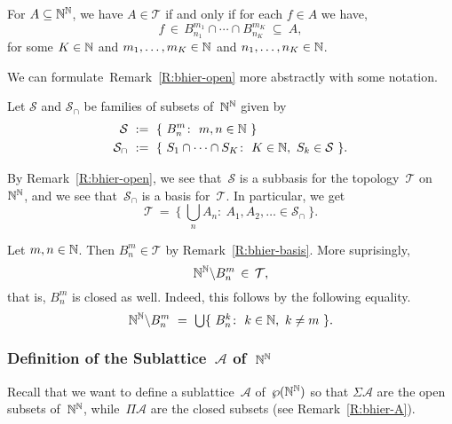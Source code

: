 \begin{rem}
\label{R:bhier-open}
For $A\subseteq \mathbb{N}^{\mathbb{N}}$,
we have $A\in \mathcal{T}$
if and only if for each $f\in A$
we have,
\begin{equation*}
f\,\in\, B^{m_1}_{n_1} \cap \dotsb \cap B^{m_K}_{n_K} \ \subseteq\ A,
\end{equation*}
for some $K\in\mathbb{N}$ and $m_1,\dotsc,m_K\in\mathbb{N}$
and $n_1,\dotsc,n_K\in\mathbb{N}$.
\end{rem}

We can formulate~Remark~\ref{R:bhier-open} more abstractly
with some notation.
\begin{dfn}
Let $\mathcal{S}$ and $\mathcal{S}_\cap$
be families of subsets of~$\mathbb{N}^{\mathbb{N}}$
given by
\begin{alignat*}{3}
\mathcal{S} \ &\eqdf\  
\{\ B^m_n \colon \ m,n\in\N \ \} \\
\mathcal{S}_\cap \ &\eqdf \ 
\{ \ S_1 \cap \dotsb\cap S_K\colon\ 
K\in\N,\  S_k\in \mathcal{S}\ \}.
\end{alignat*}
\end{dfn}

\begin{rem}\label{R:bhier-basis}
By Remark~\ref{R:bhier-open},
we see that~$\mathcal{S}$
is a subbasis for the topology~$\mathcal{T}$
on~$\mathbb{N}^{\mathbb{N}}$,
and we see that~$\mathcal{S}_\cap$ is a basis
for~$\mathcal{T}$.
In particular, we get
\begin{equation}
\label{eq:expression-t}
\mathcal{T}\ =\ 
\{\ \textstyle{\bigcup_n} A_n\colon \ A_1,A_2,\dotsc \in \mathcal{S}_\cap\ \}.
\end{equation}
\end{rem}
\begin{rem}\label{R:bhier-clopen}
Let $m,n\in\mathbb{N}$. Then  $B^m_n \in \mathcal{T}$ by Remark~\ref{R:bhier-basis}.
More suprisingly,
\begin{equation*}
\mathbb{N}^{\mathbb{N}} \backslash B^m_n\,\in\, \mathcal{T},
\end{equation*}
that is, $B^m_n$ is closed as well.
Indeed, this follows by the following equality.
\begin{equation*}
\N^\N \backslash B^m_n \ =\ 
\textstyle{\bigcup} \{\  B^k_n\colon\ k\in\N,\ k\neq m\ \}.
\end{equation*}

\end{rem}
\subsubsection{Definition of the Sublattice~$\mathcal{A}$ of~$\mathbb{N}^{\mathbb{N}}$}$\,$\\
Recall that we want to define a sublattice~$\mathcal{A}$
of~$\wp(\mathbb{N}^{\mathbb{N}})$
so that $\Sigma \mathcal{A}$
are the open subsets of~$\mathbb{N}^{\mathbb{N}}$,
while~$\Pi \mathcal{A}$  are the closed subsets
(see Remark~\ref{R:bhier-A}).

